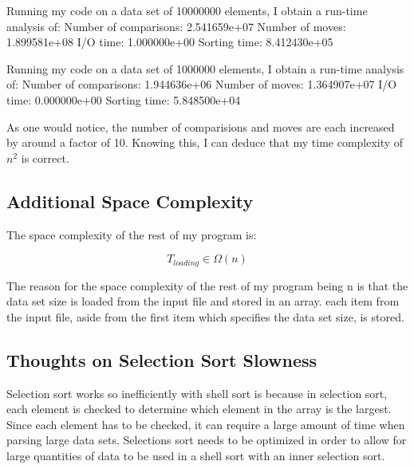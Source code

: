 \documentclass{article}
\begin{document}
Running my code on a data set of 10000000 elements, I obtain a run-time analysis of: \newline \newline
\indent Number of comparisons: 2.541659e+07 \newline
\indent Number of moves: 1.899581e+08 \newline
\indent I/O time: 1.000000e+00 \newline
\indent Sorting time: 8.412430e+05 \newline

\noindent Running my code on a data set of 1000000 elements, I obtain a run-time analysis of: \newline \newline
\indent Number of comparisons: 1.944636e+06 \newline
\indent Number of moves: 1.364907e+07 \newline
\indent I/O time: 0.000000e+00 \newline
\indent Sorting time: 5.848500e+04 \newline

\noindent As one would notice, the number of comparisions and moves are each increased by around a factor of 10.
Knowing this, I can deduce that my time complexity of \( n^2 \) is correct.

\subsection*{Additional Space Complexity}

The space complexity of the rest of my program is:

\begin{equation*}
  T_{loading} \in \Omega (n)
\end{equation*}

\noindent The reason for the space complexity of the rest of my program being n is that the data set size is loaded from the input file and stored in an array.  each item from the input file, aside from the first item which specifies the data set size, is stored.
\subsection*{Thoughts on Selection Sort Slowness}

Selection sort works so inefficiently with shell sort is because in selection sort, each element is checked to determine which element in the array is the largest.  Since each element has to be checked, it can require a large amount of time when parsing large data sets.
Selections sort needs to be optimized in order to allow for large quantities of data to be used in a shell sort with an inner selection sort.
\end{document}
